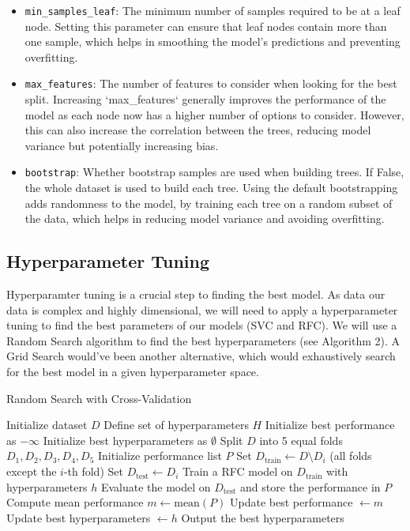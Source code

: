 \documentclass[twocolumn]{article}
\begin{document}
\begin{itemize}
    \item \texttt{min\_samples\_leaf}: The minimum number of samples required to be at a leaf node. Setting this parameter can ensure that leaf nodes contain more than one sample, which helps in smoothing the model's predictions and preventing overfitting.

    \item \texttt{max\_features}: The number of features to consider when looking for the best split. Increasing `max\_features` generally improves the performance of the model as each node now has a higher number of options to consider. However, this can also increase the correlation between the trees, reducing model variance but potentially increasing bias.

    \item \texttt{bootstrap}: Whether bootstrap samples are used when building trees. If False, the whole dataset is used to build each tree. Using the default bootstrapping adds randomness to the model, by training each tree on a random subset of the data, which helps in reducing model variance and avoiding overfitting.
    
\end{itemize}
\subsection{Hyperparameter Tuning}
Hyperparamter tuning is a crucial step to finding the best model. As data our data is complex and highly dimensional, we will need to apply a hyperparameter tuning to find the best parameters of our models (SVC and RFC). We will use a Random Search algorithm to find the best hyperparameters (see Algorithm 2). A Grid Search would've been another alternative, which would exhaustively search for the best model in a given hyperparameter space.   

\begin{algorithm}
\caption{Random Search with Cross-Validation}
\begin{algorithmic}[1]
\State Initialize dataset $D$
\State Define set of hyperparameters $H$
\State Initialize best performance as $-\infty$
\State Initialize best hyperparameters as $\emptyset$
    \State Split $D$ into 5 equal folds $D_1, D_2, D_3, D_4, D_5$
    \State Initialize performance list $P$
        \State Set $D_{\text{train}} \gets D \setminus D_i$ (all folds except the $i$-th fold)
        \State Set $D_{\text{test}} \gets D_i$
        \State Train a RFC model on $D_{\text{train}}$ with hyperparameters $h$
        \State Evaluate the model on $D_{\text{test}}$ and store the performance in $P$
    \EndFor
    \State Compute mean performance $m \gets \text{mean}(P)$
        \State Update best performance $ \gets m$
        \State Update best hyperparameters $\gets h$
    \EndIf
\EndFor
\State Output the best hyperparameters
\end{algorithmic}
\end{algorithm}
\end{document}
